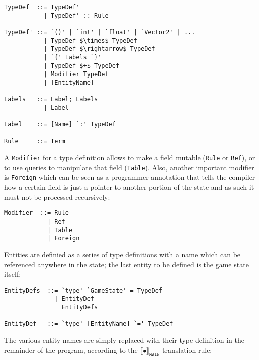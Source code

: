 \begin{lstlisting}
TypeDef  ::= TypeDef'
           | TypeDef' :: Rule
          
TypeDef' ::= `()' | `int' | `float' | `Vector2' | ...
           | TypeDef $\times$ TypeDef
           | TypeDef $\rightarrow$ TypeDef
           | `{' Labels `}'
           | TypeDef $+$ TypeDef
           | Modifier TypeDef
           | [EntityName]
           
Labels   ::= Label; Labels
           | Label
           
Label    ::= [Name] `:' TypeDef
                     
Rule     ::= Term
\end{lstlisting}

A \texttt{Modifier} for a type definition allows to make a field mutable (\texttt{Rule} or \texttt{Ref}), or to use queries to manipulate that field (\texttt{Table}). Also, another important modifier is \texttt{Foreign} which can be seen as a programmer annotation that tells the compiler how a certain field is just a pointer to another portion of the state and as such it must not be processed recursively:

\begin{lstlisting}
Modifier  ::= Rule
            | Ref
            | Table
            | Foreign
\end{lstlisting}

Entities are definied as a series of type definitions with a name which can be referenced anywhere in the state; the last entity to be defined is the game state itself:

\begin{lstlisting}
EntityDefs  ::= `type' `GameState' = TypeDef
              | EntityDef
                EntityDefs

EntityDef   ::= `type' [EntityName] `=' TypeDef
\end{lstlisting}

The various entity names are simply replaced with their type definition in the remainder of the program, according to the $\llbracket \bullet \rrbracket_{\mathtt{MAIN}}$ translation rule:


